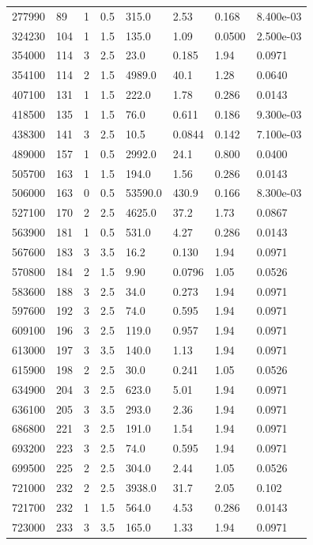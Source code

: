 \documentclass[preview]{standalone}
\begin{document}
{{\begin{tabular}{L{1.2cm}C{1.2cm} C{0.3cm}C{0.5cm} C{1.4cm}C{1.4cm} C{1.4cm}C{1.4cm}}
  277990  &    89  & 1     & 0.5 &  315.0  & 2.53  & 0.168 &  8.400e-03   \\ 
  324230  &   104  & 1     & 1.5 &  135.0  & 1.09  & 0.0500 &  2.500e-03   \\ 
  354000  &   114  & 3     & 2.5 &  23.0  & 0.185  & 1.94 &  0.0971   \\ 
  354100  &   114  & 2     & 1.5 &  4989.0  & 40.1  & 1.28 &  0.0640   \\ 
  407100  &   131  & 1     & 1.5 &  222.0  & 1.78  & 0.286 &  0.0143   \\ 
  418500  &   135  & 1     & 1.5 &  76.0  & 0.611  & 0.186 &  9.300e-03   \\ 
  438300  &   141  & 3     & 2.5 &  10.5  & 0.0844  & 0.142 &  7.100e-03   \\ 
  489000  &   157  & 1     & 0.5 &  2992.0  & 24.1  & 0.800 &  0.0400   \\ 
  505700  &   163  & 1     & 1.5 &  194.0  & 1.56  & 0.286 &  0.0143   \\ 
  506000  &   163  & 0     & 0.5 &  53590.0  & 430.9  & 0.166 &  8.300e-03   \\ 
  527100  &   170  & 2     & 2.5 &  4625.0  & 37.2  & 1.73 &  0.0867   \\ 
  563900  &   181  & 1     & 0.5 &  531.0  & 4.27  & 0.286 &  0.0143   \\ 
  567600  &   183  & 3     & 3.5 &  16.2  & 0.130  & 1.94 &  0.0971   \\ 
  570800  &   184  & 2     & 1.5 &  9.90  & 0.0796  & 1.05 &  0.0526   \\ 
  583600  &   188  & 3     & 2.5 &  34.0  & 0.273  & 1.94 &  0.0971   \\ 
  597600  &   192  & 3     & 2.5 &  74.0  & 0.595  & 1.94 &  0.0971   \\ 
  609100  &   196  & 3     & 2.5 &  119.0  & 0.957  & 1.94 &  0.0971   \\ 
  613000  &   197  & 3     & 3.5 &  140.0  & 1.13  & 1.94 &  0.0971   \\ 
  615900  &   198  & 2     & 2.5 &  30.0  & 0.241  & 1.05 &  0.0526   \\ 
  634900  &   204  & 3     & 2.5 &  623.0  & 5.01  & 1.94 &  0.0971   \\ 
  636100  &   205  & 3     & 3.5 &  293.0  & 2.36  & 1.94 &  0.0971   \\ 
  686800  &   221  & 3     & 2.5 &  191.0  & 1.54  & 1.94 &  0.0971   \\ 
  693200  &   223  & 3     & 2.5 &  74.0  & 0.595  & 1.94 &  0.0971   \\ 
  699500  &   225  & 2     & 2.5 &  304.0  & 2.44  & 1.05 &  0.0526   \\ 
  721000  &   232  & 2     & 2.5 &  3938.0  & 31.7  & 2.05 &  0.102   \\ 
  721700  &   232  & 1     & 1.5 &  564.0  & 4.53  & 0.286 &  0.0143   \\ 
  723000  &   233  & 3     & 3.5 &  165.0  & 1.33  & 1.94 &  0.0971   \\ 
\hline 
\end{tabular} 

}}
\end{document}

